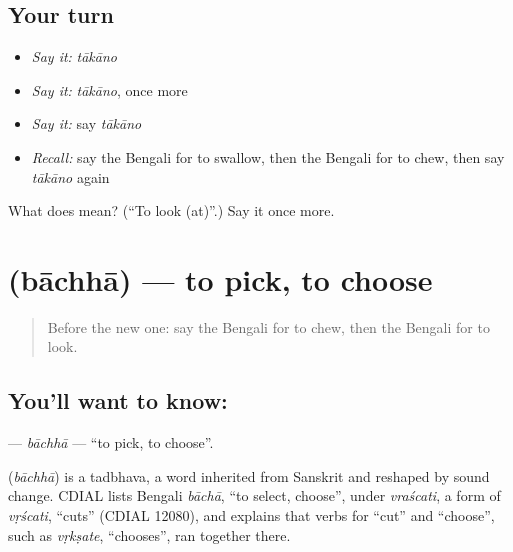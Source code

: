\subsection*{Your turn}
\begin{itemize}
\raggedright
  \item \emph{Say it:} \emph{tākāno}
  \item \emph{Say it:} \emph{tākāno}, once more
  \item \emph{Say it:} say \emph{tākāno}
  \item \emph{Recall:} say the Bengali for to swallow, then the Bengali for to chew, then say \emph{tākāno} again
\end{itemize}

\begin{tcolorbox}[breakable,colback=teal!4,colframe=teal!35!black,title={Before you move on}]
What does  mean? (\textquotedblleft{}To look (at)\textquotedblright{}.) Say it once more.
\end{tcolorbox}
\section[\texorpdfstring{\bn{বাছা} (bāchhā)}{বাছা (bāchhā)}]{ (bāchhā) — to pick, to choose}

\label{lesson:BN-C179-bachha}



\begin{quote}
Before the new one: say the Bengali for to chew, then the Bengali for to look.
\end{quote}

\subsection*{You'll want to know: }
\textbf{} — \emph{bāchhā} — \textquotedblleft{}to pick, to choose\textquotedblright{}.

\begin{cousinweb}
\textbf{} (\emph{bāchhā}) is a tadbhava, a word inherited from Sanskrit and reshaped by sound change. CDIAL lists Bengali \emph{bāchā}, \textquotedblleft{}to select, choose\textquotedblright{}, under \emph{vraścati}, a form of \emph{vṛścati}, \textquotedblleft{}cuts\textquotedblright{} (CDIAL 12080), and explains that verbs for \textquotedblleft{}cut\textquotedblright{} and \textquotedblleft{}choose\textquotedblright{}, such as \emph{vṛkṣate}, \textquotedblleft{}chooses\textquotedblright{}, ran together there.
\end{cousinweb}

